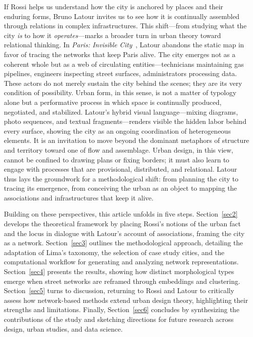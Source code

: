\documentclass[land,article,accept,pdftex,oneauthor]{Definitions/mdpi}
\begin{document}
If Rossi helps us understand how the city is anchored by places and their enduring forms, Bruno Latour invites us to see how it is continually assembled through relations in complex infrastructures. This shift---from studying what the city \textit{{is}} to how it \mbox{\textit{{operates}}---marks} a broader turn in urban theory toward relational thinking. In \textit{{Paris: Invisible City}}~\cite{latour_paris_2021}, Latour abandons the static map in favor of tracing the networks that keep Paris alive. The city emerges not as a coherent whole but as a web of circulating \mbox{entities---technicians} maintaining gas pipelines, engineers inspecting street surfaces, administrators processing data. These actors do not merely sustain the city behind the scenes; they are its very condition of possibility. Urban form, in this sense, is not a matter of typology alone but a performative process in which space is continually produced, negotiated, and stabilized. Latour’s hybrid visual language---mixing diagrams, photo sequences, and textual fragments---renders visible the hidden labor behind every surface, showing the city as an ongoing coordination of heterogeneous elements. It is an invitation to move beyond the dominant metaphors of structure and territory toward one of flow and assemblage. Urban design, in this view, cannot be confined to drawing plans or fixing borders; it must also learn to engage with processes that are provisional, distributed, and relational. Latour thus lays the groundwork for a methodological shift: from planning the city to tracing its emergence, from conceiving the urban as an object to mapping the associations and infrastructures that keep it alive.

Building on these perspectives, this article unfolds in five steps. Section~\ref{sec2} develops the theoretical framework by placing Rossi’s notions of the urban fact and the locus in dialogue with Latour’s account of associations, framing the city as a network. Section~\ref{sec3} outlines the methodological approach, detailing the adaptation of Lima’s taxonomy, the selection of case study cities, and the computational workflow for generating and analyzing network representations. Section~\ref{sec4} presents the results, showing how distinct morphological types emerge when street networks are reframed through embeddings and clustering. Section~\ref{sec5} turns to discussion, returning to Rossi and Latour to critically assess how network-based methods extend urban design theory, highlighting their strengths and limitations. Finally, Section~\ref{sec6} concludes by synthesizing the contributions of the study and sketching directions for future research across design, urban studies, and data science.
\end{document}
